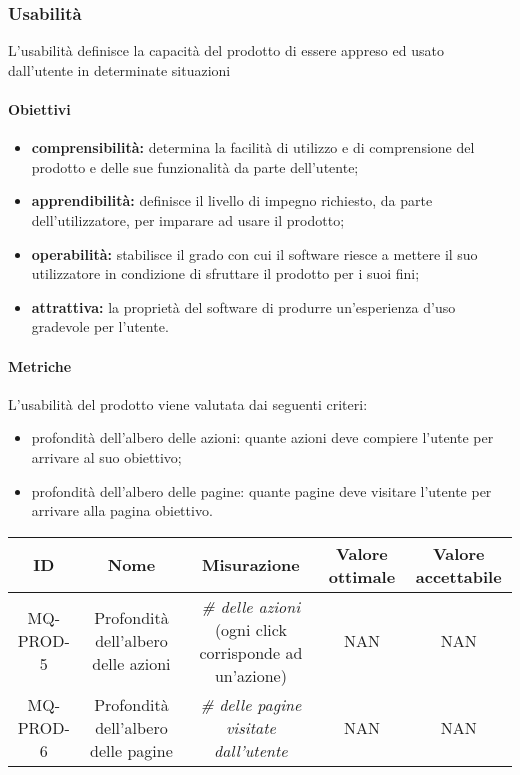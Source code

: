 \subsubsection{Usabilità}
L'usabilità definisce la capacità del prodotto di essere appreso ed usato dall'utente in determinate situazioni
	\paragraph{Obiettivi}
		\begin{itemize}
			\item \textbf{comprensibilità:} determina la facilità di utilizzo e di comprensione del prodotto e delle sue funzionalità da parte dell'utente;
			\item \textbf{apprendibilità:} definisce il livello di impegno richiesto, da parte dell'utilizzatore, per imparare ad usare il prodotto;
			\item \textbf{operabilità:} stabilisce il grado con cui il software riesce a mettere il suo utilizzatore in condizione di sfruttare il prodotto per i suoi fini;
			\item \textbf{attrattiva:} la proprietà del software di produrre un'esperienza d'uso gradevole per l'utente.
		\end{itemize}
	\paragraph{Metriche}
	L'usabilità del prodotto viene valutata dai seguenti criteri:
	\begin{itemize}
		\item profondità dell'albero delle azioni: quante azioni deve compiere l'utente per arrivare al suo obiettivo;
		\item profondità dell'albero delle pagine: quante pagine deve visitare l'utente per arrivare alla pagina obiettivo.
	\end{itemize}
	\begin{center}
		\begin{tabular}{|c|c|c|c|c|}
			\hline
			ID & Nome & Misurazione & Valore ottimale & Valore accettabile \\
			\hline
			MQ-PROD-5 & Profondità dell'albero delle azioni & \textit{\# delle azioni} (ogni click corrisponde ad un'azione) & NAN & NAN \\
			\hline
			MQ-PROD-6 & Profondità dell'albero delle pagine & \textit{\# delle pagine visitate dall'utente} & NAN & NAN \\
			\hline
		\end{tabular}
	\end{center}
